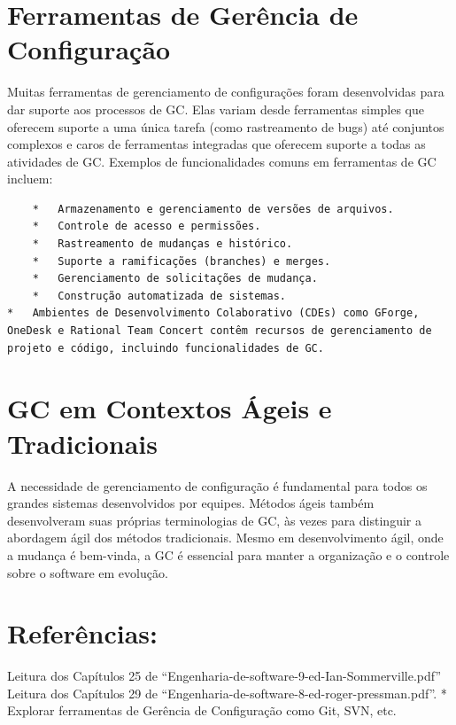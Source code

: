 \documentclass[
]{book}
\begin{document}
\section{Ferramentas de Gerência de Configuração}\label{ferramentas-de-geruxeancia-de-configurauxe7uxe3o}

Muitas ferramentas de gerenciamento de configurações foram desenvolvidas para dar suporte aos processos de GC. Elas variam desde ferramentas simples que oferecem suporte a uma única tarefa (como rastreamento de bugs) até conjuntos complexos e caros de ferramentas integradas que oferecem suporte a todas as atividades de GC. Exemplos de funcionalidades comuns em ferramentas de GC incluem:

\begin{verbatim}
    *   Armazenamento e gerenciamento de versões de arquivos.
    *   Controle de acesso e permissões.
    *   Rastreamento de mudanças e histórico.
    *   Suporte a ramificações (branches) e merges.
    *   Gerenciamento de solicitações de mudança.
    *   Construção automatizada de sistemas.
*   Ambientes de Desenvolvimento Colaborativo (CDEs) como GForge, OneDesk e Rational Team Concert contêm recursos de gerenciamento de projeto e código, incluindo funcionalidades de GC.
\end{verbatim}

\section{GC em Contextos Ágeis e Tradicionais}\label{gc-em-contextos-uxe1geis-e-tradicionais}

A necessidade de gerenciamento de configuração é fundamental para todos os grandes sistemas desenvolvidos por equipes. Métodos ágeis também desenvolveram suas próprias terminologias de GC, às vezes para distinguir a abordagem ágil dos métodos tradicionais. Mesmo em desenvolvimento ágil, onde a mudança é bem-vinda, a GC é essencial para manter a organização e o controle sobre o software em evolução.

\section{Referências:}\label{referuxeancias}

Leitura dos Capítulos 25 de ``Engenharia-de-software-9-ed-Ian-Sommerville.pdf'' Leitura dos Capítulos 29 de ``Engenharia-de-software-8-ed-roger-pressman.pdf''. * Explorar ferramentas de Gerência de Configuração como Git, SVN, etc.
\end{document}
